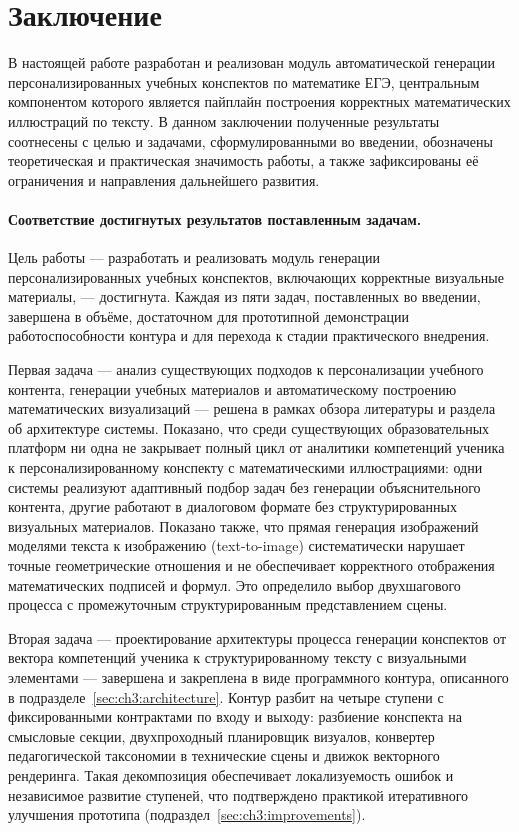 \section*{Заключение}

В настоящей работе разработан и реализован модуль автоматической генерации
персонализированных учебных конспектов по математике ЕГЭ, центральным
компонентом которого является пайплайн построения корректных
математических иллюстраций по тексту. В данном заключении полученные
результаты соотнесены с целью и задачами, сформулированными во введении,
обозначены теоретическая и практическая значимость работы, а также
зафиксированы её ограничения и направления дальнейшего развития.

\paragraph{Соответствие достигнутых результатов поставленным задачам.}
Цель работы --- разработать и реализовать модуль генерации
персонализированных учебных конспектов, включающих корректные визуальные
материалы, --- достигнута. Каждая из пяти задач, поставленных во введении,
завершена в объёме, достаточном для прототипной демонстрации работоспособности
контура и для перехода к стадии практического внедрения.

Первая задача --- анализ существующих подходов к персонализации учебного
контента, генерации учебных материалов и автоматическому построению
математических визуализаций --- решена в рамках обзора литературы и раздела
об архитектуре системы. Показано, что среди существующих образовательных
платформ ни одна не закрывает полный цикл от аналитики компетенций ученика
к персонализированному конспекту с математическими иллюстрациями: одни
системы реализуют адаптивный подбор задач без генерации объяснительного
контента, другие работают в диалоговом формате без структурированных
визуальных материалов. Показано также, что прямая генерация изображений
моделями текста к изображению (text\nobreakdash-to\nobreakdash-image)
систематически нарушает точные геометрические отношения и не обеспечивает
корректного отображения математических подписей и формул. Это определило
выбор двухшагового процесса с промежуточным структурированным
представлением сцены.

Вторая задача --- проектирование архитектуры процесса генерации конспектов
от вектора компетенций ученика к структурированному тексту с визуальными
элементами --- завершена и закреплена в виде программного контура,
описанного в подразделе~\ref{sec:ch3:architecture}. Контур разбит на
четыре ступени с фиксированными контрактами по входу и выходу: разбиение
конспекта на смысловые секции, двухпроходный планировщик визуалов,
конвертер педагогической таксономии в технические сцены и движок
векторного рендеринга. Такая декомпозиция обеспечивает локализуемость
ошибок и независимое развитие ступеней, что подтверждено практикой
итеративного улучшения прототипа (подраздел~\ref{sec:ch3:improvements}).

